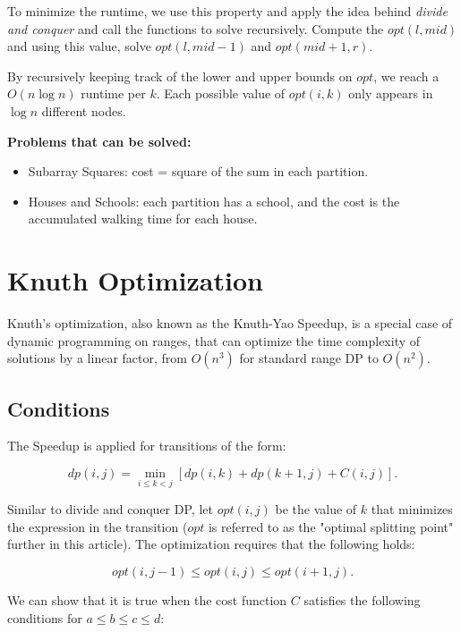         To minimize the runtime, we use this property and apply the idea behind \textit{divide and conquer} 
        and call the functions to solve recursively. Compute the $opt(l, mid)$ and using this value, 
        solve $opt(l, mid-1)$ and $opt(mid+1, r)$.
        
        By recursively keeping track of the lower and upper bounds on $opt$, 
        we reach a $O(n \log n)$ runtime per $k$. Each possible value of $opt(i, k)$ only appears in $\log n$ different nodes.

        \textbf{Problems that can be solved:}

        \begin{itemize}
        \item Subarray Squares: cost = square of the sum in each partition.
        \item Houses and Schools: each partition has a school, and the cost is the accumulated walking time for each house.
        \end{itemize}


\section{Knuth Optimization}

    Knuth's optimization, also known as the Knuth-Yao Speedup, is a special case of dynamic programming on ranges, 
    that can optimize the time complexity of solutions by a linear factor, from $O(n^3)$ for standard range DP to $O(n^2)$.

    \subsection{Conditions}

        The Speedup is applied for transitions of the form:

        $$dp(i, j) = \min_{i \leq k < j} [ dp(i, k) + dp(k+1, j) + C(i, j) ].$$

        Similar to divide and conquer DP, let $opt(i, j)$ be the value of $k$ that minimizes the expression in the transition 
        ($opt$ is referred to as the "optimal splitting point" further in this article). The optimization requires that the following holds:

        $$opt(i, j-1) \leq opt(i, j) \leq opt(i+1, j).$$

        We can show that it is true when the cost function 
        $C$ satisfies the following conditions for $a \leq b \leq c \leq d$:

